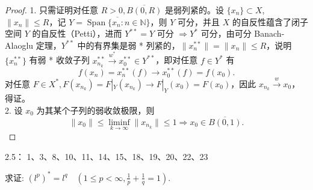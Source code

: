 \documentclass[lang=cn,newtx,10pt,scheme=chinese,thmcnt=chapter]{elegantbook}
\begin{document}
\begin{proof}
1. 只需证明对任意 $R > 0, \overline{B(0, R)}$ 是弱列紧的。设 $\{x_n\} \subset X$, $\|x_n\| \leqslant R$，记 $Y = \overline{\operatorname{Span}\{x_n : n \in \mathbb{N}\}}$，则 $Y$ 可分，并且 $X$ 的自反性蕴含了闭子空间 $Y$ 的自反性（Petti），进而 $Y^{* *} = Y$ 可分 $\Rightarrow Y^*$ 可分，由可分 Banach-Alaoglu 定理，$Y^{* *}$ 中的有界集是弱 * 列紧的，$\|x_n^{* *}\| = \|x_n\| \leqslant R$，说明 $\{x_n^{* *}\}$ 有弱 * 收敛子列 $x_{n_k}^{* *} \xrightarrow{w^*} x_0^{* *} \in Y^{* *}$，即对任意 $f \in Y^*$ 有
\[
f(x_n) = x_n^{* *}(f) \to x_0^{* *}(f) = f(x_0).
\]
对任意 $F \in X^*, F(x_{n_k}) = F|_Y(x_{n_k}) \to F|_Y(x_0) = F(x_0)$，因此 $x_{n_k} \xrightarrow{w} x_0$，得证。\\
2. 设 $x_0$ 为其某个子列的弱收敛极限，则
\[
\|x_0\| \leqslant \liminf_{k \to \infty} \|x_{n_k}\| \leqslant 1 \Rightarrow x_0 \in \overline{B(0,1)}.
\]
\end{proof}
2.5： 1、3、8、10、11、14、15、18、19、20、22、23
\begin{problem}
  求证: $\left({l}^p\right)^* = {l}^q \quad (1 \leqslant p < \infty, \frac{1}{p} + \frac{1}{q} = 1)$.
\end{problem}
\end{document}
